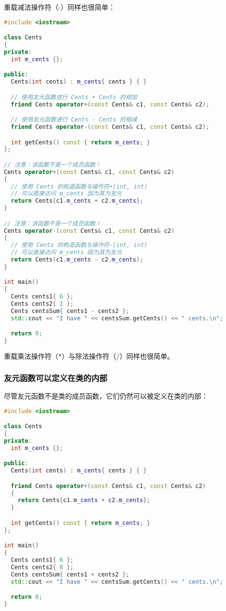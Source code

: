 \documentclass[../../LearnCpp.tex]{subfiles}
\begin{document}
重载减法操作符（-）同样也很简单：

\begin{lstlisting}[language=C++]
#include <iostream>

class Cents
{
private:
  int m_cents {};

public:
  Cents(int cents) : m_cents{ cents } { }

  // 使用友元函数进行 Cents + Cents 的相加
  friend Cents operator+(const Cents& c1, const Cents& c2);

  // 使用友元函数进行 Cents - Cents 的相减
  friend Cents operator-(const Cents& c1, const Cents& c2);

  int getCents() const { return m_cents; }
};

// 注意：该函数不是一个成员函数！
Cents operator+(const Cents& c1, const Cents& c2)
{
  // 使用 Cents 的构造函数与操作符+(int, int)
  // 可以直接访问 m_cents 因为其为友元
  return Cents{c1.m_cents + c2.m_cents};
}

// 注意：该函数不是一个成员函数！
Cents operator-(const Cents& c1, const Cents& c2)
{
  // 使用 Cents 的构造函数与操作符-(int, int)
  // 可以直接访问 m_cents 因为其为友元
  return Cents(c1.m_cents - c2.m_cents);
}

int main()
{
  Cents cents1{ 6 };
  Cents cents2{ 2 };
  Cents centsSum{ cents1 - cents2 };
  std::cout << "I have " << centsSum.getCents() << " cents.\n";

  return 0;
}
\end{lstlisting}

重载乘法操作符（*）与除法操作符（/）同样也很简单。

\subsubsection*{友元函数可以定义在类的内部}

尽管友元函数不是类的成员函数，它们仍然可以被定义在类的内部：

\begin{lstlisting}[language=C++]
#include <iostream>

class Cents
{
private:
  int m_cents {};

public:
  Cents(int cents) : m_cents{ cents } { }

  friend Cents operator+(const Cents& c1, const Cents& c2)
  {
    return Cents{c1.m_cents + c2.m_cents};
  }

  int getCents() const { return m_cents; }
};

int main()
{
  Cents cents1{ 6 };
  Cents cents2{ 8 };
  Cents centsSum{ cents1 + cents2 };
  std::cout << "I have " << centsSum.getCents() << " cents.\n";

  return 0;
}
\end{lstlisting}
\end{document}
